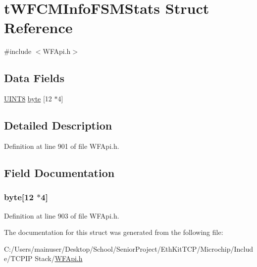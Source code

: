 \hypertarget{structt_w_f_c_m_info_f_s_m_stats}{}\section{t\+W\+F\+C\+M\+Info\+F\+S\+M\+Stats Struct Reference}
\label{structt_w_f_c_m_info_f_s_m_stats}


{\ttfamily \#include $<$W\+F\+Api.\+h$>$}

\subsection*{Data Fields}
\begin{DoxyCompactItemize}
\item 
\hyperlink{_generic_type_defs_8h_ab27e9918b538ce9d8ca692479b375b6a}{U\+I\+N\+T8} \hyperlink{structt_w_f_c_m_info_f_s_m_stats_ac9096b965dcf244dc4a369cacfe47efe}{byte} \mbox{[}12 $\ast$4\mbox{]}
\end{DoxyCompactItemize}


\subsection{Detailed Description}


Definition at line 901 of file W\+F\+Api.\+h.



\subsection{Field Documentation}
\hypertarget{structt_w_f_c_m_info_f_s_m_stats_ac9096b965dcf244dc4a369cacfe47efe}{}
\subsubsection[{byte}]{ byte\mbox{[}12 $\ast$4\mbox{]}}\label{structt_w_f_c_m_info_f_s_m_stats_ac9096b965dcf244dc4a369cacfe47efe}


Definition at line 903 of file W\+F\+Api.\+h.



The documentation for this struct was generated from the following file\+:\begin{DoxyCompactItemize}
\item 
C\+:/\+Users/mainuser/\+Desktop/\+School/\+Senior\+Project/\+Eth\+Kit\+T\+C\+P/\+Microchip/\+Include/\+T\+C\+P\+I\+P Stack/\hyperlink{_w_f_api_8h}{W\+F\+Api.\+h}\end{DoxyCompactItemize}
